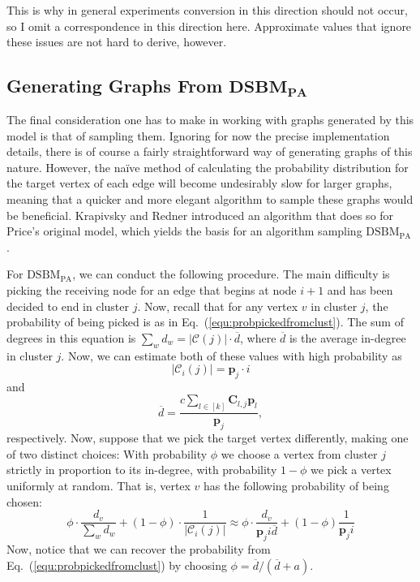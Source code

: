 This is why in general experiments conversion in this direction should not occur, so I omit a 
correspondence in this direction here. Approximate values that ignore these issues are not hard to 
derive, however.

\subsection[Generating Graphs From $\mathrm{DSBM}_\mathrm{PA}$]{Generating Graphs From $\mathbf{DSBM}_\mathbf{PA}$}
The final consideration one has to make in working with graphs generated by this model is that of
sampling them. Ignoring for now the precise implementation details, there is of course a fairly 
straightforward way of generating graphs of this nature. However, the na\"ive method of 
calculating the probability distribution for the target vertex of each edge will become 
undesirably slow for larger graphs, meaning that a quicker and more elegant algorithm to sample 
these graphs would be beneficial. Krapivsky and Redner introduced an algorithm that 
does so for Price's original model, which yields the basis for an algorithm sampling 
$\mathrm{DSBM}_\mathrm{PA}$ \cite{redner}. 

For $\mathrm{DSBM}_\mathrm{PA}$, we can conduct the following procedure. The main difficulty is 
picking the receiving node for an edge that begins at node $i+1$ and has been decided to end in 
cluster $j$. Now, recall that for any vertex $v$ in cluster $j$, the probability of being picked 
is as in Eq.\ (\ref{equ:probpickedfromclust}). The sum of degrees in this equation is $\sum_{w} 
d_w = | \mathcal{C}(j)| \cdot \overline d$, where $\overline d$ is the average in-degree in 
cluster $j$. Now, we can estimate both of these values with high probability as
$$
	|\mathcal{C}_{i}(j)| = \mathbf{p}_j \cdot i
$$
and 
$$
	\overline d = \frac{c \sum_{l\in[k]} \mathbf{C}_{l,j}\mathbf{p}_l}{\mathbf{p}_j},
$$
respectively. Now, suppose that we pick the target vertex differently, making one of two distinct 
choices: With probability $\phi$ we choose a vertex from cluster $j$ strictly in proportion to its 
in-degree, with probability $1-\phi$ we pick a vertex uniformly at random. That is, vertex $v$ has 
the following probability of being chosen:
$$
	\phi \cdot \frac{d_v}{\sum_w d_w} + (1-\phi) \cdot \frac{1}{|\mathcal{C}_{i}(j)|} \approx
	\phi \cdot \frac{d_v}{\mathbf{p}_j i \overline d} + (1-\phi) \frac{1}{\mathbf{p}_j i}
$$	
Now, notice that we can recover the probability from Eq.\ (\ref{equ:probpickedfromclust}) by 
choosing $\phi = \overline d / (\overline d + a)$.

